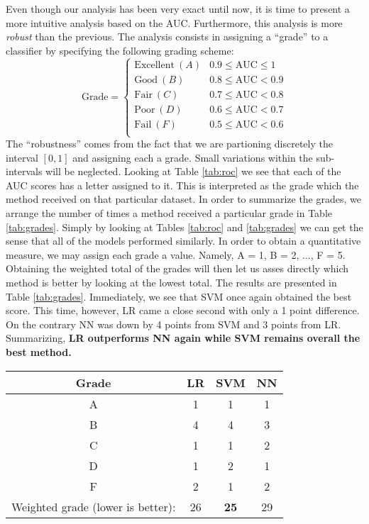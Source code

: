 \documentclass{INGUADY}
\begin{document}
Even though our analysis has been very exact until now, it is time to present a more intuitive analysis based on the AUC. Furthermore, this analysis is more \textit{robust} than the previous. The analysis consists in assigning a ``grade'' to a classifier by specifying the following grading scheme:
\[
\text{Grade} = 
\begin{cases}
\text{Excellent} \ (A) & 0.9 \leq \text{AUC}  \leq 1 \\
\text{Good} \ (B) & 0.8 \leq \text{AUC} < 0.9 \\
\text{Fair} \ (C) & 0.7 \leq \text{AUC} < 0.8 \\
\text{Poor} \  (D) & 0.6 \leq \text{AUC} < 0.7 \\
\text{Fail} \ (F) & 0.5 \leq \text{AUC} < 0.6 \\
\end{cases}
\]
The ``robustness'' comes from the fact that we are partioning discretely the interval $[0, 1]$ and assigning each a grade. Small variations within the sub-intervals will be neglected. Looking at Table \ref{tab:roc} we see that each of the AUC scores has a letter assigned to it. This is interpreted as the grade which the method received on that particular dataset. In order to summarize the grades, we arrange the number of times a method received a particular grade in Table \ref{tab:grades}. Simply by looking at Tables \ref{tab:roc} and \ref{tab:grades} we can get the sense that all of the models performed similarly. In order to obtain a quantitative measure, we may assign each grade a value. Namely, A = 1, B = 2, $\ldots$, F = 5. Obtaining the weighted total of the grades will then let us asses directly which method is better by looking at the lowest total. The results are presented in Table \ref{tab:grades}. Immediately, we see that SVM once again obtained the best score. This time, however, LR came a close second  with only a 1 point difference. On the contrary NN was down by 4 points from SVM and 3 points from LR. Summarizing, \textbf{LR outperforms NN again while SVM remains overall the best method.}

\begin{table*}
\center
\caption{The columns LR, SVM and NN indicate the numbers of times each of the methods got the grade on the leftmost column. Letting A = 1, B = 2, C = 3, D = 4, F = 5, we can calculate a weighted final grade for our classifiers and see how each of them performed. Clearly a lower grade is better. The weighted grade is just the weighted total of the grades each of these methods obtained.}
\vspace{3mm}
\setlength{\tabcolsep}{2mm}
\begin{tabular}{c|ccc}
\toprule
Grade & LR & SVM & NN \\
\midrule
A & 1 & 1 & 1\\
B & 4 & 4 & 3 \\
C & 1 & 1 & 2 \\
D & 1 & 2 & 1 \\
F & 2 & 1 & 2 \\
\midrule
Weighted grade (lower is better): & 26 & \textbf{25} & 29\\
\bottomrule
\end{tabular}
\label{tab:grades}
\end{table*}
\end{document}
